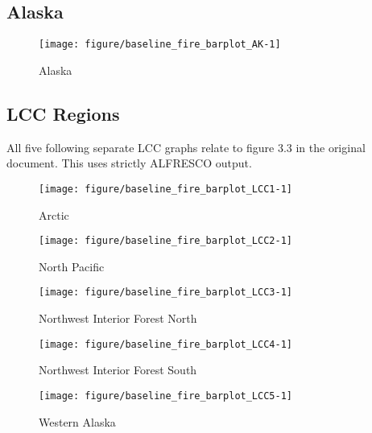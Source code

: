 \documentclass{article}\usepackage[]{graphicx}\usepackage[]{color}
\makeatletter
\def\maxwidth{ %
  \ifdim\Gin@nat@width>\linewidth
    \linewidth
  \else
    \Gin@nat@width
  \fi
}
\makeatother
\begin{document}
\subsection{Alaska}
\begin{figure}[H]
\texttt{[image: figure/baseline\_fire\_barplot\_AK-1]} \caption[Alaska]{Alaska\label{fig:baseline_fire_barplot_AK}}
\end{figure}



\newpage
\subsection{LCC Regions}
All five following separate LCC graphs relate to figure 3.3 in the original document.
This uses strictly ALFRESCO output.
\begin{figure}[H]
\texttt{[image: figure/baseline\_fire\_barplot\_LCC1-1]} \caption[Arctic]{Arctic\label{fig:baseline_fire_barplot_LCC1}}
\end{figure}



\begin{figure}[H]
\texttt{[image: figure/baseline\_fire\_barplot\_LCC2-1]} \caption[North Pacific]{North Pacific\label{fig:baseline_fire_barplot_LCC2}}
\end{figure}



\begin{figure}[H]
\texttt{[image: figure/baseline\_fire\_barplot\_LCC3-1]} \caption[Northwest Interior Forest North]{Northwest Interior Forest North\label{fig:baseline_fire_barplot_LCC3}}
\end{figure}



\begin{figure}[H]
\texttt{[image: figure/baseline\_fire\_barplot\_LCC4-1]} \caption[Northwest Interior Forest South]{Northwest Interior Forest South\label{fig:baseline_fire_barplot_LCC4}}
\end{figure}



\begin{figure}[H]
\texttt{[image: figure/baseline\_fire\_barplot\_LCC5-1]} \caption[Western Alaska]{Western Alaska\label{fig:baseline_fire_barplot_LCC5}}
\end{figure}
\end{document}
